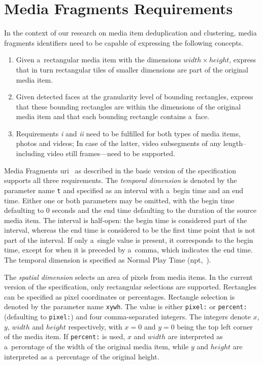 \documentclass{article}
\begin{document}

\section{Media Fragments Requirements}
\label{sec:media-fragment-requirements}

In the context of our research on media item deduplication and clustering, media fragments identifiers need to be capable of expressing the following concepts.
\begin{enumerate}[i]
  \itemsep0em
  \item Given a~rectangular media item with the dimensions $ width \times height $, express that in turn rectangular tiles of smaller dimensions are part of the original media item.
  \item Given detected faces at the granularity level of bounding rectangles, express that these bounding rectangles are within the dimensions of the original media item and that each bounding rectangle contains a~face.
  \item Requirements \textit{i} and \textit{ii} need to be fulfilled for both types of media items, photos and videos; In case of the latter, video subsegments of any length--including video still frames---need to be supported.
\end{enumerate}

Media Fragments {\sc uri}~\cite{troncy2012mediafragments} as described in the basic version of the specification supports all three requirements. The \emph{temporal dimension} is denoted by the parameter name \texttt{t} and specified as an interval with a~begin time and an end time. Either one or both parameters may be omitted, with the begin time defaulting to 0 seconds and the end time defaulting to the duration of the source media item. The interval is half-open: the begin time is considered part of the interval, whereas the end time is considered to be the first time point that is not part of the interval.
If only a~single value is present, it corresponds to the begin time, except for when it is preceded by a~comma, which indicates the end time. The temporal dimension is specified as Normal Play Time ({\sc npt},~\cite{schulzrinne1998realtime}).

The \emph{spatial dimension} selects an area of pixels from media items. In the current version of the specification, only rectangular selections are supported. Rectangles can be specified as pixel coordinates or percentages. Rectangle selection is denoted by the parameter name \texttt{xywh}. The value is either \texttt{pixel:} or \texttt{percent:} (defaulting to \texttt{pixel:}) and four comma-separated integers. The integers denote $x$, $y$, $width$ and $height$ respectively, with $x = 0$ and $y = 0$ being the top left corner of the media item. If \texttt{percent:} is used,\linebreak
$x$ and $width$ are interpreted as a~percentage of the width of the original media item, while $y$ and $height$ are interpreted as a~percentage of the original height.
\end{document}
